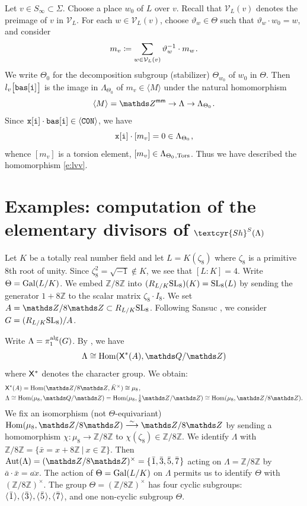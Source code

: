 \documentclass[11pt]{amsart}
\renewcommand{\mathbb}{\mathds}
\newcommand{\Sha}{{\!\textcyr{Sh}}}
\theoremstyle{plain}
\theoremstyle{definition}
\newcommand{\Q}{{\mathbb Q}}
\newcommand{\Z}{{\mathbb Z}}
\newcommand{\X}{{\sf X}}
\DeclareMathOperator{\Aut}{Aut}
\newcommand{\Hom}{{\rm Hom}}
\newcommand{\Gal}{{\rm Gal}}
\newcommand{\ov}{\overline}
\newcommand{\isoto}{\overset{\sim}{\longrightarrow}}
\newcommand{\hs}{\kern 0.8pt}
\newcommand{\SL}{{\rm SL}}
\newcommand{\alg}{{\rm alg}}
\newcommand{\V}{{\mathcal V}}
\newcommand{\Tors}{{\rm Tors}}
\newcommand{\vt}{{\vartheta}}
\newcommand{\la}{\langle}
\newcommand{\ra}{\rangle}
\newcommand{\smm}{{\sf mm}}
\begin{document}
Let $v\in S_\infty\subset \Sigma$. Choose a place  $w_0$ of $L$ over $v$.
Recall that $\V_L(v)$ denotes the preimage of $v$ in $\V_L$.
For each $w\in \V_L(v)$,  choose $\vt_w\in\Theta$ such that $\vt_w\cdot w_0=w$,
and consider
\[ m_v\coloneqq\sum_{w\in \V_L(v)}\vt_w^{-1}\cdot m_w\hs.\]
We write $\Theta_0$ for the decomposition subgroup (stabilizer)
$\Theta_{w_0}$ of $w_0$ in $\Theta$.
Then $l_v\tt\big[bas[i]\hs\big]$
is the image in $\Lambda_{\Theta_0}$ of $m_v\in\la M\ra$
under the natural homomorphism
\[ \la M\ra=\Z^\smm\to \Lambda\to\Lambda_{\Theta_0}\hs.\]
Since $ \tt x[i]\cdot bas[i]\in \la C0N\ra$, we have
\[{\tt x[i]}\cdot [m_v]=0\in \Lambda_{\Theta_0}\hs,\]
whence $[m_v]$ is a torsion element, $[m_v]\in\Lambda_{\Theta_0\hs,\Tors}$\hs.
Thus we have described the homomorphism \eqref{e:lvv}.



\section{Examples: computation of the elementary divisors of $\Sha^S(\Lambda)$}
\label{s:example}

Let $K$ be a totally real number field and let $L=K(\zeta_8)$
where $\zeta_8$ is a primitive 8th root of unity.
Since $\zeta_8^2=\sqrt{-1}\notin K$, we see that $[L:K]=4$.
Write $\Theta=\Gal(L/K)$.
We embed $\Z/8\Z$ into $(R_{L/K}\SL_8)(K)=\SL_8(L)$ by sending the generator $1+8\Z$ to the scalar matrix $\zeta_8\cdot I_8$.
We set $A=\Z/8\Z\subset R_{L/K}\SL_8$.
Following Sansuc \cite[Example 5.8]{Sansuc},  we consider  $G=(R_{L/K}\SL_8)/A$.

Write $\Lambda=\pi_1^\alg(G)$. By \cite[Corollary C.2.2]{BK}, we have
\[ \Lambda\cong\Hom(\X^*(A),\Q/\Z)\]
where $\X^*$ denotes the character group.
We obtain:
\begin{align*}
 &\X^*(A)=\Hom(\Z/8\Z,\bar K^\times)\cong\mu_8\hs,\\
&\Lambda\cong\Hom(\mu_8,\Q/\Z)=\Hom(\mu_8,\tfrac18\Z/\Z)\cong\Hom(\mu_8,\Z/8\Z).
\end{align*}
We fix an isomorphism (not $\Theta$-equivariant)
 $\Hom(\mu_8,\Z/8\Z)\isoto\Z/8\Z$
by sending a homomorphism $\chi\colon\mu_8\to\Z/8\Z$ to $\chi(\zeta_8)\in \Z/8\Z$.
We identify $\Lambda$ with $\Z/8\Z=\{\bar x=x+8\Z\ |\  x\in \Z\}$.
Then $\Aut(\Lambda)=(\Z/8\Z)^\times=\{\hs\bar 1,\bar 3,\bar 5,\bar 7\hs\}$
acting on $\Lambda=\Z/8\Z$ by  $\bar a\cdot\bar x=\ov{ax}$.
The action of $\Theta=\Gal(L/K)$ on $\Lambda$ permits us to identify  $\Theta$ with $(\Z/8\Z)^\times$.
The group $\Theta=(\Z/8\Z)^\times$ has four cyclic subgroups:
$\langle\hs\bar1\hs\rangle,\langle\hs\bar3\hs\rangle, \langle\hs\bar5\hs\rangle, \langle\hs\bar7\hs\rangle$,
and one non-cyclic subgroup $\Theta$.
\end{document}
